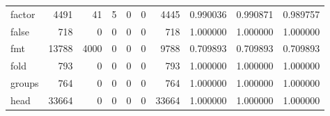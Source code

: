 \begin{tabular}{lrrrrrrrrr}
factor    &                                               4491 &                                                 41 &                                                  5 &                                                  0 &                                                  0 &                                               4445 &                                           0.990036 &                               0.990871 &                             0.989757 \\
false     &                                                718 &                                                  0 &                                                  0 &                                                  0 &                                                  0 &                                                718 &                                           1.000000 &                               1.000000 &                             1.000000 \\
fmt       &                                              13788 &                                               4000 &                                                  0 &                                                  0 &                                                  0 &                                               9788 &                                           0.709893 &                               0.709893 &                             0.709893 \\
fold      &                                                793 &                                                  0 &                                                  0 &                                                  0 &                                                  0 &                                                793 &                                           1.000000 &                               1.000000 &                             1.000000 \\
groups    &                                                764 &                                                  0 &                                                  0 &                                                  0 &                                                  0 &                                                764 &                                           1.000000 &                               1.000000 &                             1.000000 \\
head      &                                              33664 &                                                  0 &                                                  0 &                                                  0 &                                                  0 &                                              33664 &                                           1.000000 &                               1.000000 &                             1.000000 \\

\end{tabular}
